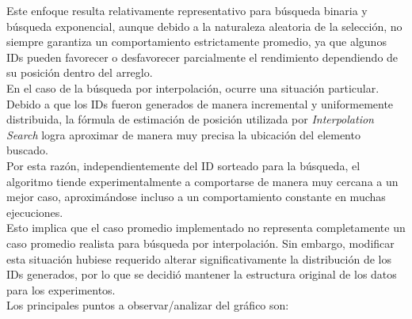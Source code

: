 Este enfoque resulta relativamente representativo para búsqueda binaria y búsqueda exponencial, aunque debido a la naturaleza aleatoria de la 
selección, no siempre garantiza un comportamiento estrictamente promedio, ya que algunos IDs pueden favorecer o desfavorecer parcialmente el 
rendimiento dependiendo de su posición dentro del arreglo. \\

En el caso de la búsqueda por interpolación, ocurre una situación particular.  Debido a que los IDs fueron generados de manera incremental y 
uniformemente distribuida, la fórmula de estimación de posición utilizada por \textit{Interpolation Search} logra aproximar de manera muy precisa 
la ubicación del elemento buscado. \\

Por esta razón, independientemente del ID sorteado para la búsqueda, el algoritmo tiende experimentalmente a comportarse de manera muy cercana a 
un mejor caso, aproximándose incluso a un comportamiento constante en muchas ejecuciones. \\

Esto implica que el caso promedio implementado no representa completamente un caso promedio realista para búsqueda por interpolación.  Sin embargo, 
modificar esta situación hubiese requerido alterar significativamente la distribución de los IDs generados, por lo que se decidió mantener la 
estructura original de los datos para los experimentos. \\

Los principales puntos a observar/analizar del gráfico son: \\

